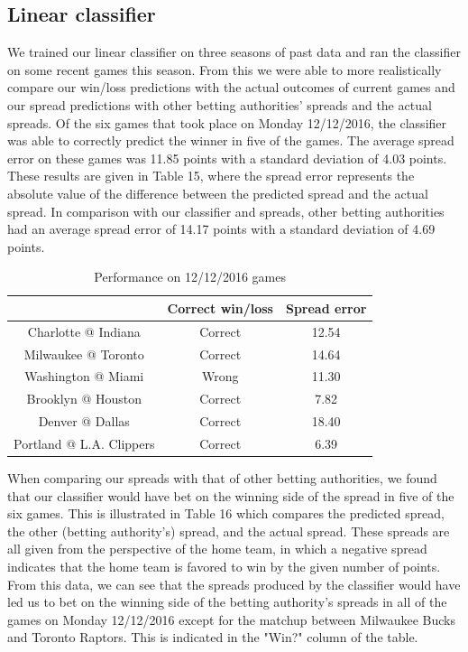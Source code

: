 \documentclass{article}
\begin{document}
\subsection{Linear classifier}
We trained our linear classifier on three seasons of past data and ran the classifier on some recent games this season. From this we were able to more realistically compare our win/loss predictions with the actual outcomes of current games and our spread predictions with other betting authorities' spreads and the actual spreads. Of the six games that took place on Monday 12/12/2016, the classifier was able to correctly predict the winner in five of the games. The average spread error on these games was 11.85 points with a standard deviation of 4.03 points. These results are given in Table 15, where the spread error represents the absolute value of the difference between the predicted spread and the actual spread. In comparison with our classifier and spreads, other betting authorities had an average spread error of 14.17 points with a standard deviation of 4.69 points.

\begin{table}
  \begin{center}
    \begin{tabular}{ | c | c | c | }
      \hline
                                & Correct win/loss     & Spread error  \\ \hline
      Charlotte @ Indiana       & Correct              & 12.54    \\ \hline
      Milwaukee @ Toronto       & Correct              & 14.64    \\ \hline
      Washington @ Miami        & Wrong                & 11.30     \\ \hline
      Brooklyn @ Houston        & Correct              & 7.82      \\ \hline
      Denver @ Dallas           & Correct              & 18.40    \\ \hline
      Portland @ L.A. Clippers  & Correct              & 6.39    \\ \hline
    \end{tabular}
  \end{center}
  \caption{Performance on 12/12/2016 games}
\end{table}

When comparing our spreads with that of other betting authorities, we found that our classifier would have bet on the winning side of the spread in five of the six games. This is illustrated in Table 16 which compares the predicted spread, the other (betting authority's) spread, and the actual spread. These spreads are all given from the perspective of the home team, in which a negative spread indicates that the home team is favored to win by the given number of points. From this data, we can see that the spreads produced by the classifier would have led us to bet on the winning side of the betting authority's spreads in all of the games on Monday 12/12/2016 except for the matchup between Milwaukee Bucks and Toronto Raptors. This is indicated in the "Win?" column of the table.
\end{document}
